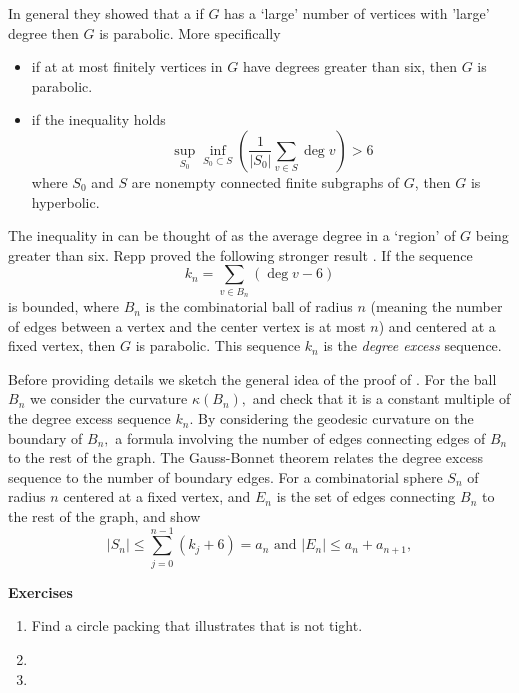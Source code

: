 In general they showed that a if $G$ has a `large' number of vertices with 'large' degree
then $G$ is parabolic. More specifically
\begin{itemize}
\item if at at most finitely vertices in $G$ have degrees greater than six, then $G$ is parabolic.
\item if the inequality holds
\begin{equation}\label{eqn:He-Sch-hyper}
\sup_{S_0}\inf_{S_0\subset S}\left(\frac{1}{|S_0|}\sum_{v\in S}\deg v \right)>6
\end{equation}
where $S_0$ and $S$ are nonempty connected finite subgraphs of $G$, then
$G$ is hyperbolic.
\end{itemize}
The inequality in  can be thought of as the average degree 
in a `region' of $G$ being greater than six.
Repp proved the following stronger result \cite{repp_bounded_2001}.
If the sequence
\begin{equation}\label{eqn:repp}
k_n=\sum_{v\in B_n}(\deg v - 6)
\end{equation}
is bounded, where $B_n$ is the combinatorial ball of radius $n$ (meaning the number of edges
between a vertex and the center vertex is at most $n$) and centered at a fixed vertex,
then $G$ is parabolic.
This sequence $k_n$ is the \emph{degree excess} sequence.



Before providing details we sketch the general idea of the proof of .
For the ball $B_n$ we consider the curvature $\kappa(B_n),$ 
and check that it is a constant multiple of the degree excess sequence $k_n.$
By considering the geodesic curvature on the boundary of $B_n,$ 
a formula involving the number of edges connecting edges of $B_n$
to the rest of the graph.
The Gauss-Bonnet theorem relates the degree excess sequence to
the number of boundary edges. For a combinatorial sphere
$S_n$ of radius $n$ centered at a fixed vertex, and $E_n$ is the set of edges
connecting $B_n$ to the rest of the graph, and show
$$|S_n|\leq \sum_{j=0}^{n-1}(k_j+6)=a_n \text{ and } |E_n|\leq a_n + a_{n+1},$$

\noindent \textbf{Exercises}


\begin{enumerate}
	\item Find a circle packing that illustrates that  is not tight.
	
	\item 
	
	\item 
	
\end{enumerate}
